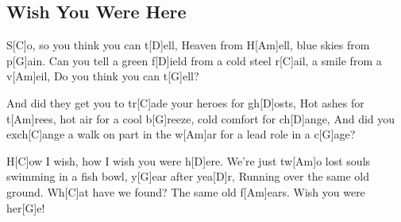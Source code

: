 \subsection*{Wish You Were Here   }
\begin{guitar}
S[C]o, so you think you can t[D]ell,
Heaven from H[Am]ell, blue skies from p[G]ain.
Can you tell a green f[D]ield from a cold steel r[C]ail, a smile from a v[Am]eil,
Do you think you can t[G]ell?



And did they get you to tr[C]ade your heroes for gh[D]osts,
Hot ashes for t[Am]rees, hot air for a cool b[G]reeze, cold comfort for ch[D]ange,
And did you exch[C]ange a walk on part in the w[Am]ar for a lead role in a c[G]age?






H[C]ow I wish, how I wish you were h[D]ere.
We're just tw[Am]o lost souls swimming in a fish bowl, y[G]ear after yea[D]r,
Running over the same old ground. Wh[C]at have we found?
The same old f[Am]ears. Wish you were her[G]e!



\end{guitar}
